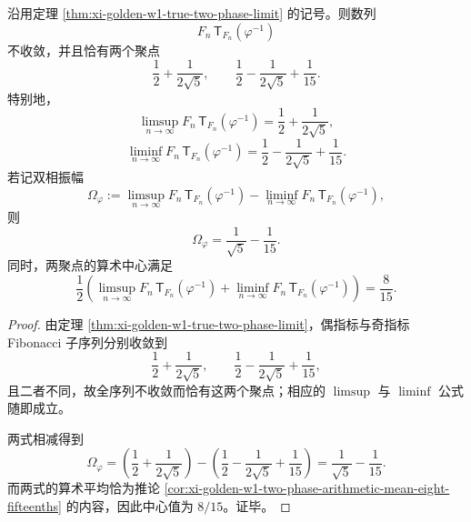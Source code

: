 \begin{corollary}\label{cor:xi-golden-w1-two-phase-amplitude-center}
沿用定理 \ref{thm:xi-golden-w1-true-two-phase-limit} 的记号。则数列
\[
F_n\,\mathsf{T}_{F_n}(\varphi^{-1})
\]
不收敛，并且恰有两个聚点
\[
\frac12+\frac{1}{2\sqrt5},
\qquad
\frac12-\frac{1}{2\sqrt5}+\frac1{15}.
\]
特别地，
\[
\boxed{\;
\limsup_{n\to\infty}F_n\,\mathsf{T}_{F_n}(\varphi^{-1})
=
\frac12+\frac{1}{2\sqrt5},\;}
\]
\[
\boxed{\;
\liminf_{n\to\infty}F_n\,\mathsf{T}_{F_n}(\varphi^{-1})
=
\frac12-\frac{1}{2\sqrt5}+\frac1{15}.\;}
\]
若记双相振幅
\[
\Omega_\varphi
:=
\limsup_{n\to\infty}F_n\,\mathsf{T}_{F_n}(\varphi^{-1})
-
\liminf_{n\to\infty}F_n\,\mathsf{T}_{F_n}(\varphi^{-1}),
\]
则
\[
\boxed{\;
\Omega_\varphi
=
\frac1{\sqrt5}-\frac1{15}.\;}
\]
同时，两聚点的算术中心满足
\[
\boxed{\;
\frac12\left(\limsup_{n\to\infty}F_n\,\mathsf{T}_{F_n}(\varphi^{-1})
+
\liminf_{n\to\infty}F_n\,\mathsf{T}_{F_n}(\varphi^{-1})\right)
=
\frac{8}{15}.\;}
\]
\end{corollary}
\begin{proof}
由定理 \ref{thm:xi-golden-w1-true-two-phase-limit}，偶指标与奇指标 Fibonacci 子序列分别收敛到
\[
\frac12+\frac{1}{2\sqrt5},
\qquad
\frac12-\frac{1}{2\sqrt5}+\frac1{15},
\]
且二者不同，故全序列不收敛而恰有这两个聚点；相应的 \(\limsup\) 与 \(\liminf\) 公式随即成立。

两式相减得到
\[
\Omega_\varphi
=
\left(\frac12+\frac{1}{2\sqrt5}\right)
-
\left(\frac12-\frac{1}{2\sqrt5}+\frac1{15}\right)
=
\frac1{\sqrt5}-\frac1{15}.
\]
而两式的算术平均恰为推论
\ref{cor:xi-golden-w1-two-phase-arithmetic-mean-eight-fifteenths} 的内容，因此中心值为 \(8/15\)。证毕。
\end{proof}

